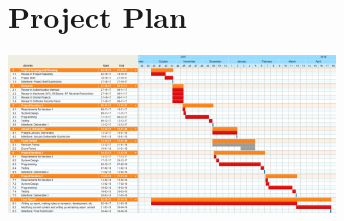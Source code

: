 \appendix

\begingroup
\chapter{Project Plan}
\label{app:gannt_chart}
\begin{center}
	\includegraphics[angle=90,width=0.65\textwidth,height=0.65\textheight,keepaspectratio]{Graphics/FYP-Project-Plan}
\end{center}
\endgroup